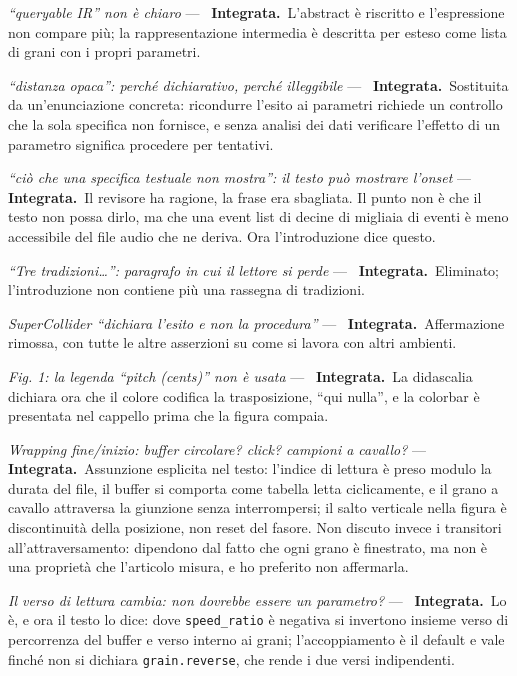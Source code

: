 \documentclass[11pt,a4paper]{article}
\newcommand{\integrata}{\textbf{Integrata.}}
\newenvironment{rilievi}
  {\begin{list}{}{%
    \setlength{\leftmargin}{1.6em}\setlength{\itemindent}{-1.6em}%
    \setlength{\itemsep}{4pt}\setlength{\parsep}{0pt}\setlength{\topsep}{4pt}}}
  {\end{list}}
\newcommand{\voce}[1]{\item \textit{#1} ---\ }
\begin{document}
\begin{rilievi}

\voce{``queryable IR'' non è chiaro} \integrata\ L'abstract è riscritto e
l'espressione non compare più; la rappresentazione intermedia è descritta
per esteso come lista di grani con i propri parametri.

\voce{``distanza opaca'': perché dichiarativo, perché illeggibile}
\integrata\ Sostituita da un'enunciazione concreta: ricondurre l'esito ai
parametri richiede un controllo che la sola specifica non fornisce, e senza
analisi dei dati verificare l'effetto di un parametro significa procedere
per tentativi.

\voce{``ciò che una specifica testuale non mostra'': il testo può mostrare
l'onset} \integrata\ Il revisore ha ragione, la frase era sbagliata. Il
punto non è che il testo non possa dirlo, ma che una event list di decine di
migliaia di eventi è meno accessibile del file audio che ne deriva. Ora
l'introduzione dice questo.

\voce{``Tre tradizioni\ldots'': paragrafo in cui il lettore si perde}
\integrata\ Eliminato; l'introduzione non contiene più una rassegna di
tradizioni.

\voce{SuperCollider ``dichiara l'esito e non la procedura''} \integrata\
Affermazione rimossa, con tutte le altre asserzioni su come si lavora con
altri ambienti.

\voce{Fig. 1: la legenda ``pitch (cents)'' non è usata} \integrata\ La
didascalia dichiara ora che il colore codifica la trasposizione, ``qui
nulla'', e la colorbar è presentata nel cappello prima che la figura
compaia.

\voce{Wrapping fine/inizio: buffer circolare? click? campioni a cavallo?}
\integrata\ Assunzione esplicita nel testo: l'indice di lettura è preso
modulo la durata del file, il buffer si comporta come tabella letta
ciclicamente, e il grano a cavallo attraversa la giunzione senza
interrompersi; il salto verticale nella figura è discontinuità della
posizione, non reset del fasore. Non discuto invece i transitori
all'attraversamento: dipendono dal fatto che ogni grano è finestrato, ma
non è una proprietà che l'articolo misura, e ho preferito non affermarla.

\voce{Il verso di lettura cambia: non dovrebbe essere un parametro?}
\integrata\ Lo è, e ora il testo lo dice: dove \texttt{speed\_ratio} è
negativa si invertono insieme verso di percorrenza del buffer e verso
interno ai grani; l'accoppiamento è il default e vale finché non si dichiara
\texttt{grain.reverse}, che rende i due versi indipendenti.


\end{rilievi}
\end{document}
